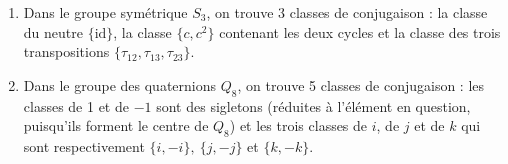 
\begin{enumerate}
 \item Dans le groupe symétrique $S_3$, on trouve 3 classes de conjugaison : la classe du neutre $\{\textrm{id}\}$, la classe $\{c, c^2\}$ contenant les deux cycles et la classe des trois transpositions $\{\tau_{12}, \tau_{13}, \tau_{23} \}$.

 \item Dans le groupe des quaternions $Q_8$, on trouve 5 classes de conjugaison : les classes de 1 et de $-1$ sont des sigletons (réduites à l'élément en question, puisqu'ils forment le centre de $Q_8$) et les trois classes de $i$, de $j$ et de $k$ qui sont respectivement $\{i, -i\},~ \{j, -j\}$ et $\{k, -k\}$.
\end{enumerate}
